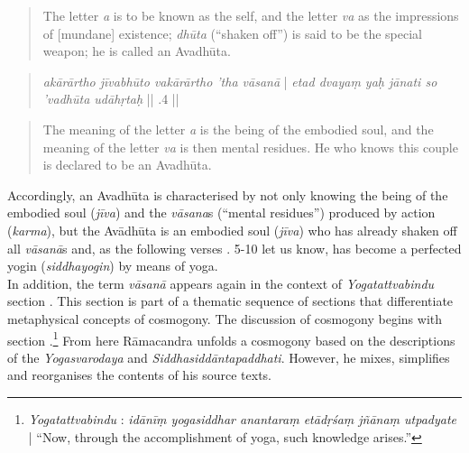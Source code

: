 \begin{quote}
  The letter \textit{a} is to be known as the self, and the letter \textit{va} as the impressions of [mundane] existence; \textit{dhūta} (``shaken off'') is said to be the special weapon; he is called an Avadhūta.
\end{quote}

\begin{quote}
  \textit{akārārtho jīvabhūto vakārārtho 'tha vāsanā} |
  \textit{etad dvayaṃ yaḥ jānati so 'vadhūta udāhṛtaḥ} || .4 ||
    \end{quote}

    \begin{quote}
      The meaning of the letter \textit{a} is the being of the embodied soul, and the meaning of the letter \textit{va} is then mental residues. He who knows this couple is declared to be an Avadhūta.
    \end{quote}
    
    Accordingly, an Avadhūta is characterised by not only knowing the being of the embodied soul (\textit{jīva}) and the \textit{vāsana}s (``mental residues'') produced by action (\textit{karma}), but the Avādhūta is an embodied soul (\textit{jīva}) who has already shaken off all \textit{vāsanā}s and, as the following verses . 5-10 let us know, has become a perfected yogin (\textit{siddhayogin}) by means of yoga. \\
    
    In addition, the term \textit{vāsanā} appears again in the context of \textit{Yogatattvabindu} section . This section is part of a thematic sequence of sections that differentiate metaphysical concepts of cosmogony. The discussion of cosmogony begins with section .\footnote{\emph{Yogatattvabindu} : \textit{idānīṃ yogasiddhar anantaraṃ etādṛśaṃ jñānaṃ utpadyate} | ``Now, through the accomplishment of yoga, such knowledge arises.''} From here Rāmacandra unfolds a cosmogony based on the descriptions of the \textit{Yogasvarodaya} and \textit{Siddhasiddāntapaddhati}. However, he mixes, simplifies and reorganises the contents of his source texts.

